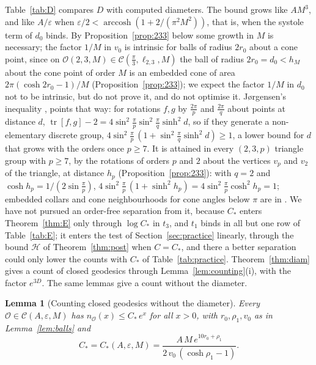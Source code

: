 \documentclass[pdflatex,sn-mathphys-num]{sn-jnl}
\theoremstyle{thmstyleone}%
\newtheorem{lemma}[theorem]{Lemma}%
\theoremstyle{thmstylethree}%
\newcommand{\Orb}{\mathcal{O}}
\newcommand{\Cl}{\mathcal{C}}
\begin{document}
Table~\ref{tab:D} compares $D$ with computed diameters. The bound grows like $AM^3$, and like $A/\varepsilon$ when $\varepsilon/2<\operatorname{arccosh}(1+2/(\pi^2M^2))$, that is, when the systole term of $d_0$ binds. By Proposition~\ref{prop:233} below some growth in $M$ is necessary; the factor $1/M$ in $v_0$ is intrinsic for balls of radius $2r_0$ about a cone point, since on $\Orb(2,3,M)\in\Cl(\frac\pi3,\ell_{2,3},M)$ the ball of radius $2r_0=d_0<h_M$ about the cone point of order $M$ is an embedded cone of area $2\pi(\cosh2r_0-1)/M$ (Proposition~\ref{prop:233}); we expect the factor $1/M$ in $d_0$ not to be intrinsic, but do not prove it, and do not optimise it. Jørgensen's inequality \cite{jorgensen1976}, \cite[\S5.4]{beardon1983} points that way: for rotations $f,g$ by $\frac{2\pi}p$ and $\frac{2\pi}q$ about points at distance $d$, $\operatorname{tr}[f,g]-2=4\sin^2\frac\pi p\sin^2\frac\pi q\sinh^2d$, so if they generate a non-elementary discrete group, $4\sin^2\frac\pi p\,(1+\sin^2\frac\pi q\sinh^2d)\ge1$, a lower bound for $d$ that grows with the orders once $p\ge7$. It is attained in every $(2,3,p)$ triangle group with $p\ge7$, by the rotations of orders $p$ and $2$ about the vertices $v_p$ and $v_2$ of the triangle, at distance $h_p$ (Proposition~\ref{prop:233}): with $q=2$ and $\cosh h_p=1/(2\sin\frac\pi p)$, $4\sin^2\frac\pi p\,(1+\sinh^2h_p)=4\sin^2\frac\pi p\cosh^2h_p=1$; embedded collars and cone neighbourhoods for cone angles below $\pi$ are in \cite{dryden2007collars}. We have not pursued an order-free separation from it, because $C_*$ enters Theorem~\ref{thm:E} only through $\log C_*$ in $t_3$, and $t_1$ binds in all but one row of Table~\ref{tab:E}; it enters the test of Section~\ref{sec:practice} linearly, through the bound $\mathcal H$ of Theorem~\ref{thm:post} when $C=C_*$, and there a better separation could only lower the counts with $C_*$ of Table~\ref{tab:practice}. Theorem~\ref{thm:diam} gives a count of closed geodesics through Lemma~\ref{lem:counting}(i), with the factor $e^{3D}$. The same lemmas give a count without the diameter.

\begin{lemma}[Counting closed geodesics without the diameter]\label{lem:countK}
Every $\Orb\in\Cl(A,\varepsilon,M)$ has $n_\Orb(x)\le C_*\,e^x$ for all $x>0$, with $r_0,\rho_1,v_0$ as in Lemma~\ref{lem:balls} and
\[
  C_*=C_*(A,\varepsilon,M)=\frac{A\,M\,e^{10r_0+\rho_1}}{2\,v_0\,(\cosh\rho_1-1)} .
\]
\end{lemma}
\end{document}
